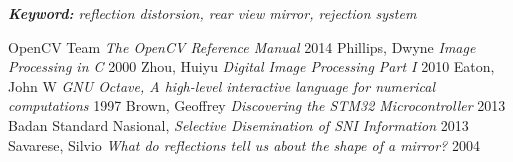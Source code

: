 \documentclass[a4paper,10pt]{article}
\begin{document}
\textit{\textbf{Keyword:} reflection distorsion, rear view mirror, rejection system}

\begin{thebibliography}{}
     OpenCV Team \textit{The OpenCV Reference Manual} 2014
     Phillips, Dwyne \textit{Image Processing in C} 2000
     Zhou, Huiyu \textit{Digital Image Processing Part I} 2010
    Eaton, John W \textit{GNU Octave, A high-level interactive language for numerical computations} 1997
    Brown, Geoffrey \textit{Discovering the STM32 Microcontroller} 2013
    Badan Standard Nasional, \textit{Selective Disemination of SNI Information} 2013
     Savarese, Silvio \textit{What do reflections tell us about the shape of a mirror?} 2004
\end{thebibliography}
\end{document}

